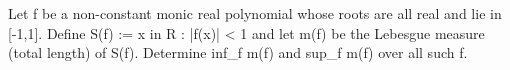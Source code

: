 Let f be a non-constant monic real polynomial whose roots are all real and lie in [-1,1]. Define
  S(f) := { x in R : |f(x)| < 1 }
and let m(f) be the Lebesgue measure (total length) of S(f). Determine
  inf_f m(f)  and  sup_f m(f)
over all such f.
